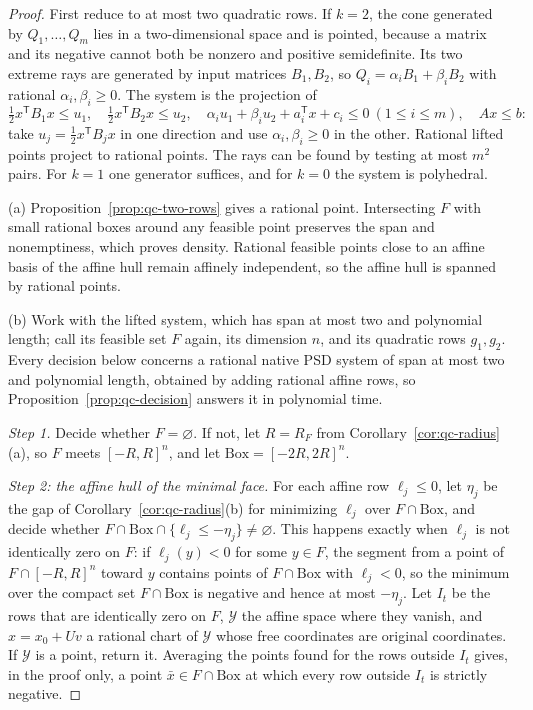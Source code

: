 \begin{proof}
First reduce to at most two quadratic rows. If $k=2$, the cone generated by
$Q_1,\ldots,Q_m$ lies in a two-dimensional space and is pointed, because a
matrix and its negative cannot both be nonzero and positive semidefinite. Its
two extreme rays are generated by input matrices $B_1,B_2$, so
$Q_i=\alpha_iB_1+\beta_iB_2$ with rational $\alpha_i,\beta_i\ge0$. The system
is the projection of
\[
\tfrac12x^{\mathsf T}B_1x\le u_1,\quad\tfrac12x^{\mathsf T}B_2x\le u_2,\quad
\alpha_iu_1+\beta_iu_2+a_i^{\mathsf T}x+c_i\le0\ (1\le i\le m),\quad Ax\le b:
\]
take $u_j=\tfrac12x^{\mathsf T}B_jx$ in one direction and use
$\alpha_i,\beta_i\ge0$ in the other. Rational lifted points project to
rational points. The rays can be found by testing at most $m^2$ pairs. For
$k=1$ one generator suffices, and for $k=0$ the system is polyhedral.

(a) Proposition~\ref{prop:qc-two-rows} gives a rational point. Intersecting
$F$ with small rational boxes around any feasible point preserves the span
and nonemptiness, which proves density. Rational feasible points close to an
affine basis of the affine hull remain affinely independent, so the affine
hull is spanned by rational points.

(b) Work with the lifted system, which has span at most two and polynomial
length; call its feasible set $F$ again, its dimension $n$, and its
quadratic rows $g_1,g_2$. Every decision below concerns a rational native PSD
system of span at most two and polynomial length, obtained by adding rational
affine rows, so Proposition~\ref{prop:qc-decision} answers it in polynomial
time.

\emph{Step 1.} Decide whether $F=\varnothing$. If not, let $R=R_F$ from
Corollary~\ref{cor:qc-radius}(a), so $F$ meets $[-R,R]^n$, and let
$\mathrm{Box}=[-2R,2R]^n$.

\emph{Step 2: the affine hull of the minimal face.} For each affine row
$\ell_j\le0$, let $\eta_j$ be the gap of Corollary~\ref{cor:qc-radius}(b) for
minimizing $\ell_j$ over $F\cap\mathrm{Box}$, and decide whether
$F\cap\mathrm{Box}\cap\{\ell_j\le-\eta_j\}\ne\varnothing$. This happens exactly
when $\ell_j$ is not identically zero on $F$: if $\ell_j(y)<0$ for some
$y\in F$, the segment from a point of $F\cap[-R,R]^n$ toward $y$ contains
points of $F\cap\mathrm{Box}$ with $\ell_j<0$, so the minimum over the compact
set $F\cap\mathrm{Box}$ is negative and hence at most $-\eta_j$. Let $I_t$ be
the rows that are identically zero on $F$, $\mathcal Y$ the affine space where
they vanish, and $x=x_0+Uv$ a rational chart of $\mathcal Y$ whose free
coordinates are original coordinates. If $\mathcal Y$ is a point, return it.
Averaging the points found for the rows outside $I_t$ gives, in the proof
only, a point $\bar x\in F\cap\mathrm{Box}$ at which every row outside $I_t$
is strictly negative.


\end{proof}
